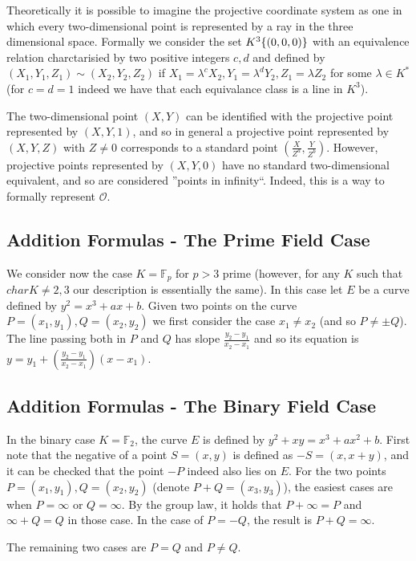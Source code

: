 \documentclass[11pt,english]{article}
\begin{document}
Theoretically it is possible to imagine the projective coordinate system as one in which every two-dimensional point is represented by a ray in the three
dimensional space. Formally we consider the set $K^3\\\{(0,0,0)\}$ with an equivalence relation charctarisied by two positive integers $c,d$ and
defined by $(X_1,Y_1,Z_1)\sim (X_2,Y_2,Z_2)$ if $X_1=\lambda^cX_2,Y_1=\lambda^dY_2,Z_1=\lambda Z_2$ for some $\lambda\in K^*$ (for $c=d=1$
indeed we have that each equivalance class is a line in $K^3$).

The two-dimensional point $(X,Y)$ can be identified with the projective point represented by $(X,Y,1)$, and so in general a projective point represented by
$(X,Y,Z)$ with $Z\ne 0$ corresponds to a standard point $(\frac{X}{Z^a},\frac{Y}{Z^b})$. However, projective points represented by $(X,Y,0)$
have no standard two-dimensional equivalent, and so are considered ''points in infinity``. Indeed, this is a way to formally represent $\mathcal{O}$.

\subsection{Addition Formulas - The Prime Field Case}
We consider now the case $K=\mathbb{F}_p$ for $p>3$ prime (however, for any $K$ such that $char K\ne 2,3$ our description is essentially the same).
In this case let $E$ be a curve defined by $y^2=x^3+ax+b$. Given two points on the curve $P=(x_1,y_1),Q=(x_2,y_2)$ we first consider the case $x_1\ne x_2$
(and so $P\ne\pm Q$). The line passing both in $P$ and $Q$ has slope $\frac{y_2-y_1}{x_2-x_1}$ and so its equation is $y=y_1+\left(\frac{y_2-y_1}{x_2-x_1}\right)(x-x_1)$.

\subsection{Addition Formulas - The Binary Field Case}
In the binary case $K=\mathbb{F}_2$, the curve $E$ is defined by $y^2+xy=x^3+ax^2+b$. First note that the negative of a point $S=(x,y)$ is defined as $-S=(x,x+y)$, and it can be checked that the point $-P$ indeed also lies on $E$.
For the two points $P=(x_1,y_1),Q=(x_2,y_2)$ (denote $P+Q=(x_3,y_3)$), the easiest cases are when $P=\infty$ or $Q=\infty$. By the group law, it holds that $P+\infty=P$ and $\infty+Q=Q$ in those case. In the case of $P=-Q$, the result is $P+Q=\infty$.

The remaining two cases are $P=Q$ and $P\ne Q$.
\end{document}
